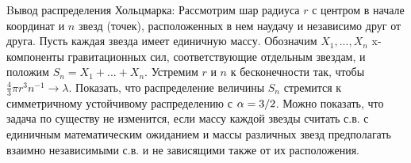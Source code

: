 \begin{problem}
Bывод распределения Хольцмарка: Рассмотрим шар радиуса $r$ с центром в начале координат и $n$ звезд (точек), расположенных в нем наудачу и независимо друг от друга. Пусть каждая звезда имеет единичную массу. Обозначим $X_{1} ,...,X_{n} $ x-компоненты гравитационных сил, соответствующие отдельным звездам, и положим $S_{n} =X_{1} +...+X_{n} $. Устремим $r$ и $n$ к бесконечности так, чтобы $\frac{4}{3} \pi r^{3} n^{-1} \to \lambda $. Показать, что распределение величины $S_{n} $ стремится к симметричному устойчивому распределению с $\alpha ={3\mathord{\left/ {\vphantom {3 2}} \right. \kern-\nulldelimiterspace} 2} $. Можно показать, что задача по существу не изменится, если массу каждой звезды считать с.в. с единичным математическим ожиданием и массы различных звезд предполагать взаимно независимыми с.в. и не зависящими также от их расположения.
\end{problem}

